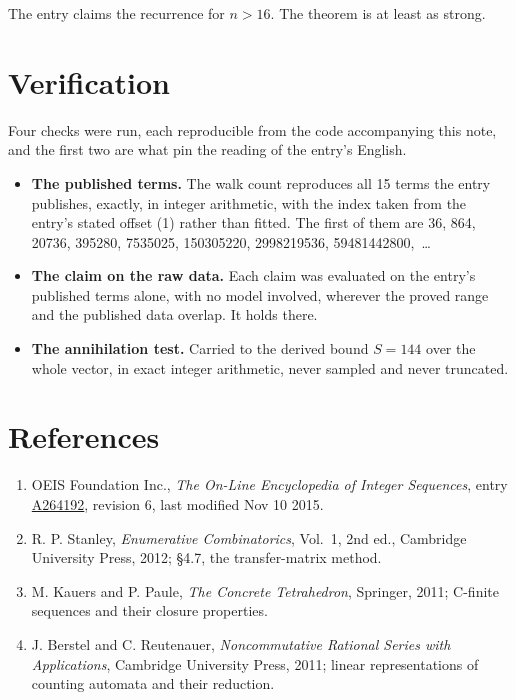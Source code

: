 \documentclass[11pt]{article}
\theoremstyle{definition}
\begin{document}
The entry claims the recurrence for $n > 16$. The theorem is at least as strong.

\section{Verification}

Four checks were run, each reproducible from the code accompanying this note, and the first two are what pin the reading of the entry's English.

\begin{itemize}

\item {\bfseries The published terms.} The walk count reproduces all 15 terms the entry publishes, exactly, in integer arithmetic, with the index taken from the entry's stated offset (1) rather than fitted. The first of them are 36, 864, 20736, 395280, 7535025, 150305220, 2998219536, 59481442800,~\dots

\item {\bfseries The claim on the raw data.} Each claim was evaluated on the entry's published terms alone, with no model involved, wherever the proved range and the published data overlap. It holds there.

\item {\bfseries The annihilation test.} Carried to the derived bound $S = 144$ over the whole vector, in exact integer arithmetic, never sampled and never truncated.

\end{itemize}

\section{References}

\begin{enumerate}

\item OEIS Foundation Inc., \emph{The On-Line Encyclopedia of Integer Sequences}, entry \href{https://oeis.org/A264192}{A264192}, revision 6, last modified Nov 10 2015.

\item R. P. Stanley, \emph{Enumerative Combinatorics}, Vol.~1, 2nd ed., Cambridge University Press, 2012; \S4.7, the transfer-matrix method.

\item M. Kauers and P. Paule, \emph{The Concrete Tetrahedron}, Springer, 2011; C-finite sequences and their closure properties.

\item J. Berstel and C. Reutenauer, \emph{Noncommutative Rational Series with Applications}, Cambridge University Press, 2011; linear representations of counting automata and their reduction.

\end{enumerate}
\end{document}
